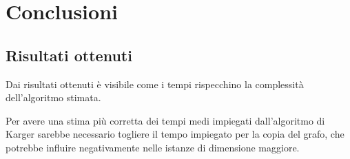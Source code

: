 \chapter{Conclusioni\label{sec:conclusioni}}

\section{Risultati ottenuti\label{sec:risultati-ottenuti}}
Dai risultati ottenuti è visibile come i tempi rispecchino la complessità dell'algoritmo stimata.

Per avere una stima più corretta dei tempi medi impiegati dall'algoritmo di Karger sarebbe necessario togliere il tempo impiegato per la copia del grafo, che potrebbe influire negativamente nelle istanze di dimensione maggiore.
